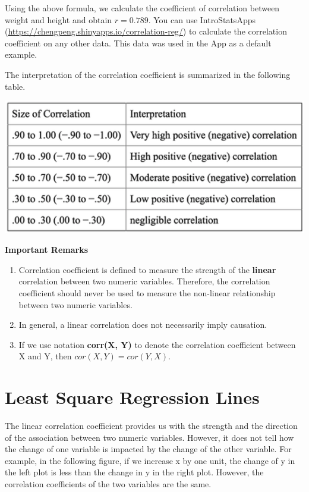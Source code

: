 \documentclass[
]{book}
\begin{document}
Using the above formula, we calculate the coefficient of correlation between weight and height and obtain \(r = 0.789\). You can use IntroStatsApps (\url{https://chengpeng.shinyapps.io/correlation-reg/}) to calculate the correlation coefficient on any other data. This data was used in the App as a default example.

The interpretation of the correlation coefficient is summarized in the following table.

\hfill\break

\begin{center}\includegraphics[width=0.6\linewidth]{week12/corrInterpretation} \end{center}

\textbf{Important Remarks}

\begin{enumerate}
\def\labelenumi{\arabic{enumi}.}
\item
  Correlation coefficient is defined to measure the strength of the \textbf{linear} correlation between two numeric variables. Therefore, the correlation coefficient should never be used to measure the non-linear relationship between two numeric variables.
\item
  In general, a linear correlation does not necessarily imply causation.
\item
  If we use notation \textbf{corr(X, Y)} to denote the correlation coefficient between X and Y, then \(cor(X, Y) = cor(Y, X)\).
\end{enumerate}

\hypertarget{least-square-regression-lines}{%
\section{Least Square Regression Lines}\label{least-square-regression-lines}}

The linear correlation coefficient provides us with the strength and the direction of the association between two numeric variables. However, it does not tell how the change of one variable is impacted by the change of the other variable. For example, in the following figure, if we increase x by one unit, the change of y in the left plot is less than the change in y in the right plot. However, the correlation coefficients of the two variables are the same.
\end{document}
